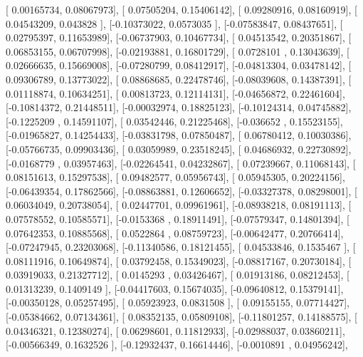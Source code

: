 \documentclass{article}
\begin{document}
       [ 0.00165734,  0.08067973],
       [ 0.07505204,  0.15406142],
       [ 0.09280916,  0.08160919],
       [ 0.04543209,  0.043828  ],
       [-0.10373022,  0.0573035 ],
       [-0.07583847,  0.08437651],
       [ 0.02795397,  0.11653989],
       [-0.06737903,  0.10467734],
       [ 0.04513542,  0.20351867],
       [ 0.06853155,  0.06707998],
       [-0.02193881,  0.16801729],
       [ 0.0728101 ,  0.13043639],
       [ 0.02666635,  0.15669008],
       [-0.07280799,  0.08412917],
       [-0.04813304,  0.03478142],
       [ 0.09306789,  0.13773022],
       [ 0.08868685,  0.22478746],
       [-0.08039608,  0.14387391],
       [ 0.01118874,  0.10634251],
       [ 0.00813723,  0.12114131],
       [-0.04656872,  0.22461604],
       [-0.10814372,  0.21448511],
       [-0.00032974,  0.18825123],
       [-0.10124314,  0.04745882],
       [-0.1225209 ,  0.14591107],
       [ 0.03542446,  0.21225468],
       [-0.036652  ,  0.15523155],
       [-0.01965827,  0.14254433],
       [-0.03831798,  0.07850487],
       [ 0.06780412,  0.10030386],
       [-0.05766735,  0.09903436],
       [ 0.03059989,  0.23518245],
       [ 0.04686932,  0.22730892],
       [-0.0168779 ,  0.03957463],
       [-0.02264541,  0.04232867],
       [ 0.07239667,  0.11068143],
       [ 0.08151613,  0.15297538],
       [ 0.09482577,  0.05956743],
       [ 0.05945305,  0.20224156],
       [-0.06439354,  0.17862566],
       [-0.08863881,  0.12606652],
       [-0.03327378,  0.08298001],
       [ 0.06034049,  0.20738054],
       [ 0.02447701,  0.09961961],
       [-0.08938218,  0.08191113],
       [ 0.07578552,  0.10585571],
       [-0.0153368 ,  0.18911491],
       [-0.07579347,  0.14801394],
       [ 0.07642353,  0.10885568],
       [ 0.0522864 ,  0.08759723],
       [-0.00642477,  0.20766414],
       [-0.07247945,  0.23203068],
       [-0.11340586,  0.18121455],
       [ 0.04533846,  0.1535467 ],
       [ 0.08111916,  0.10649874],
       [ 0.03792458,  0.15349023],
       [-0.08817167,  0.20730184],
       [ 0.03919033,  0.21327712],
       [ 0.0145293 ,  0.03426467],
       [ 0.01913186,  0.08212453],
       [ 0.01313239,  0.1409149 ],
       [-0.04417603,  0.15674035],
       [-0.09640812,  0.15379141],
       [-0.00350128,  0.05257495],
       [ 0.05923923,  0.0831508 ],
       [ 0.09155155,  0.07714427],
       [-0.05384662,  0.07134361],
       [ 0.08352135,  0.05809108],
       [-0.11801257,  0.14188575],
       [ 0.04346321,  0.12380274],
       [ 0.06298601,  0.11812933],
       [-0.02988037,  0.03860211],
       [-0.00566349,  0.1632526 ],
       [-0.12932437,  0.16614446],
       [-0.0010891 ,  0.04956242],
\end{document}
